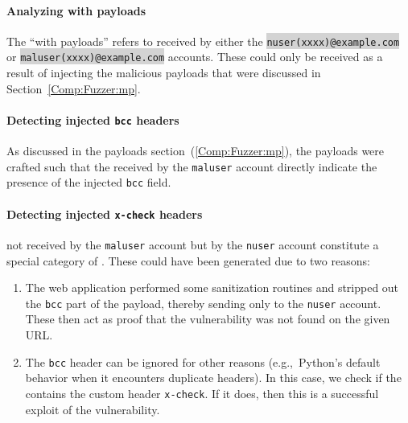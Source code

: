\paragraph{Analyzing \email with payloads}
The ``\emails with payloads'' refers to \emails received by either the \colorbox{lightgray}{\lstinline{nuser(xxxx)@example.com}} or \colorbox{lightgray}{\lstinline{maluser(xxxx)@example.com}} accounts. These \emails could only be received as a result of injecting the malicious payloads that were discussed in Section~\ref{Comp:Fuzzer:mp}. 

\paragraph{Detecting injected \texttt{bcc} headers}
As discussed in the payloads section~(\ref{Comp:Fuzzer:mp}), the payloads were crafted such that the \emails received by the \texttt{maluser} account directly indicate the presence of the injected \texttt{bcc} field. 

\label{analyze:detect_x_check}
\paragraph{Detecting injected \texttt{x-check} headers}
\Emails not received by the \texttt{maluser} account but by the \texttt{nuser} account constitute a special category of \emails.
These \emails could have been generated due to two reasons:
\begin{enumerate}
	\item The web application performed some sanitization routines and stripped out the \texttt{bcc} part of the payload, thereby sending \emails only to the \texttt{nuser} account. These \emails then act as proof that the vulnerability was not found on the given URL.
	\item The \texttt{bcc} header can be ignored for other reasons (e.g.,\ Python's default behavior when it encounters duplicate headers). In this case, we check if the \email contains the custom header \texttt{x-check}. If it does, then this is a successful exploit of the vulnerability.
\end{enumerate}
